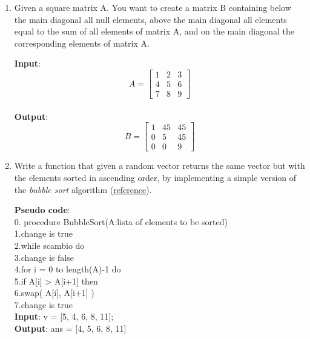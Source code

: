 \documentclass[oneside]{article}
\begin{document}
\begin{enumerate}
   \item
      Given a square matrix A. You want to create a matrix B containing below the main
      diagonal all null elements, above the main diagonal all elements equal to the sum
      of all elements of matrix A, and on the main diagonal the corresponding elements of
      matrix A.
      \begin{tcolorbox}[blanker, breakable, left=5mm, before skip=10pt, after skip=10pt,
         borderline west={1mm}{0pt}{bluepoli}]
         \textbf{Input}: \begin{equation*}
            A = \begin{bmatrix}
               1 & 2 & 3 \\
               4 & 5 & 6 \\
               7 & 8 & 9
            \end{bmatrix}
            \end{equation*}\\
         \textbf{Output}: \begin{equation*}
            B = \begin{bmatrix}
               1 & 45 & 45 \\
               0 & 5 & 45 \\
               0 & 0 & 9
            \end{bmatrix}
            \end{equation*}
      \end{tcolorbox}

   \item Write a function that given a random vector returns the same vector but with the
      elements sorted in ascending order, by implementing a simple version of the {\it
      bubble sort} algorithm (\href{https://it.wikipedia.org/wiki/Bubble_sort}{reference}).
      \begin{tcolorbox}[blanker, breakable, left=5mm, before skip=10pt, after skip=10pt,
         borderline west={1mm}{0pt}{bluepoli}]
         \textbf{Pseudo code}:\\
         0. procedure BubbleSort(A:lista of elements to be sorted)\\
         1.\hspace{1em}change is true\\
         2.\hspace{1em}while scambio do\\
         3.\hspace{2em}change is false\\
         4.\hspace{2em}for i = 0 to length(A)-1  do\\
         5.\hspace{3em}if A[i] > A[i+1] then\\
         6.\hspace{4em}swap( A[i], A[i+1] ) \\
         7.\hspace{4em}change is true\\
         \textbf{Input}: v = [5, 4, 6, 8, 11];\\
         \textbf{Output}: ans = [4, 5, 6, 8, 11]
      \end{tcolorbox}
\end{enumerate}
\end{document}
